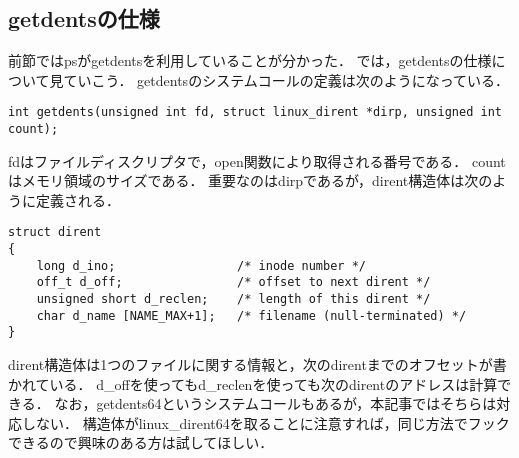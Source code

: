 \documentclass{jsarticle}
\begin{document}
  \subsection{getdentsの仕様}
  前節ではpsがgetdentsを利用していることが分かった．
  では，getdentsの仕様について見ていこう．
  getdentsのシステムコールの定義は次のようになっている．
  \begin{lstlisting}[basicstyle=\ttfamily\footnotesize, frame=single]
int getdents(unsigned int fd, struct linux_dirent *dirp, unsigned int count);
  \end{lstlisting}
  fdはファイルディスクリプタで，open関数により取得される番号である．
  countはメモリ領域のサイズである．
  重要なのはdirpであるが，dirent構造体は次のように定義される．
  \begin{lstlisting}[basicstyle=\ttfamily\footnotesize, frame=single]
struct dirent
{
    long d_ino;                 /* inode number */
    off_t d_off;                /* offset to next dirent */
    unsigned short d_reclen;    /* length of this dirent */
    char d_name [NAME_MAX+1];   /* filename (null-terminated) */
}
  \end{lstlisting}
  dirent構造体は1つのファイルに関する情報と，次のdirentまでのオフセットが書かれている．
  d\_offを使ってもd\_reclenを使っても次のdirentのアドレスは計算できる．
  なお，getdents64というシステムコールもあるが，本記事ではそちらは対応しない．
  構造体がlinux\_dirent64を取ることに注意すれば，同じ方法でフックできるので興味のある方は試してほしい．
\end{document}
